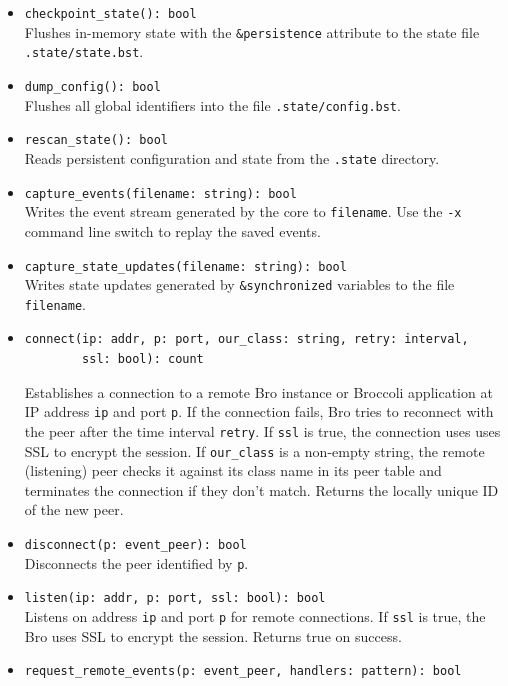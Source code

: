 \documentclass[10pt,landscape]{article}
\newcommand{\ReturnsTrueOnSuccess}{Returns true on success.\xspace}
\begin{document}
\begin{multicols*}{2}
\begin{itemize}
  \item \verb|checkpoint_state(): bool|\\
    Flushes in-memory state with the \verb|&persistence| attribute to the state
    file \texttt{.state/state.bst}.
  \item \verb|dump_config(): bool|\\
    Flushes all global identifiers into the file \texttt{.state/config.bst}.
  \item \verb|rescan_state(): bool|\\
    Reads persistent configuration and state from the \texttt{.state}
    directory.
  \item \verb|capture_events(filename: string): bool|\\
    Writes the event stream generated by the core to \verb|filename|. Use the
    \texttt{-x} command line switch to replay the saved events.
  \item \verb|capture_state_updates(filename: string): bool|\\
    Writes state updates generated by \verb|&synchronized| variables to the
    file \verb|filename|.
  \item \begin{verbatim}
connect(ip: addr, p: port, our_class: string, retry: interval,
        ssl: bool): count
\end{verbatim}
    Establishes a connection to a remote Bro instance or Broccoli application
    at IP address \verb|ip| and port \verb|p|. If the connection fails, Bro
    tries to reconnect with the peer after the time interval \verb|retry|. If
    \verb|ssl| is true, the connection uses uses SSL to encrypt the session.
    If \verb|our_class| is a non-empty string, the remote (listening) peer
    checks it against its class name in its peer table and terminates the
    connection if they don't match.
    Returns the locally unique ID of the new peer.
  \item \verb|disconnect(p: event_peer): bool|\\
    Disconnects the peer identified by \verb|p|.
  \item \verb|listen(ip: addr, p: port, ssl: bool): bool|\\
    Listens on address \verb|ip| and port \verb|p| for remote connections. If
    \verb|ssl| is true, the Bro uses SSL to encrypt the session.
    \ReturnsTrueOnSuccess
  \item \verb|request_remote_events(p: event_peer, handlers: pattern): bool|\\

\end{itemize}
\end{multicols*}
\end{document}
